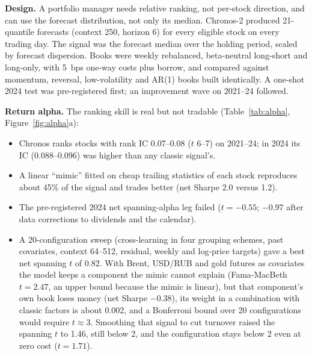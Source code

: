 \documentclass[11pt]{article}
\begin{document}
\textbf{Design.} A portfolio manager needs relative ranking, not per-stock direction, and can use the forecast
distribution, not only its median. Chronos-2 produced 21-quantile forecasts (context 250, horizon 6) for every
eligible stock on every trading day. The signal was the forecast median over the holding period, scaled by
forecast dispersion. Books were weekly rebalanced, beta-neutral long-short and long-only, with 5~bps one-way
costs plus borrow, and compared against momentum, reversal, low-volatility and AR(1) books built identically. A
one-shot 2024 test was pre-registered first; an improvement wave on 2021--24 followed.

\textbf{Return alpha.} The ranking skill is real but not tradable (Table~\ref{tab:alpha}, Figure~\ref{fig:alpha}a):
\begin{itemize}
  \item Chronos ranks stocks with rank IC 0.07--0.08 ($t$ 6--7) on 2021--24; in 2024 its IC (0.088--0.096) was
    higher than any classic signal's.
  \item A linear ``mimic'' fitted on cheap trailing statistics of each stock reproduces about 45\% of the signal
    and trades better (net Sharpe 2.0 versus 1.2).
  \item The pre-registered 2024 net spanning-alpha leg failed ($t = -0.55$; $-0.97$ after data corrections to dividends and the calendar).
  \item A 20-configuration sweep (cross-learning in four grouping schemes, past covariates, context 64--512,
    residual, weekly and log-price targets) gave a best net spanning $t$ of 0.82. With Brent, USD/RUB and gold
    futures as covariates the model keeps a component the mimic cannot explain (Fama-MacBeth $t = 2.47$, an
    upper bound because the mimic is linear), but that component's own book loses money (net Sharpe $-0.38$),
    its weight in a combination with classic factors is about 0.002, and a Bonferroni bound over 20
    configurations would require $t \approx 3$. Smoothing that signal to cut turnover raised the spanning $t$
    to 1.46, still below 2, and the configuration stays below 2 even at zero cost ($t = 1.71$).
\end{itemize}
\end{document}
